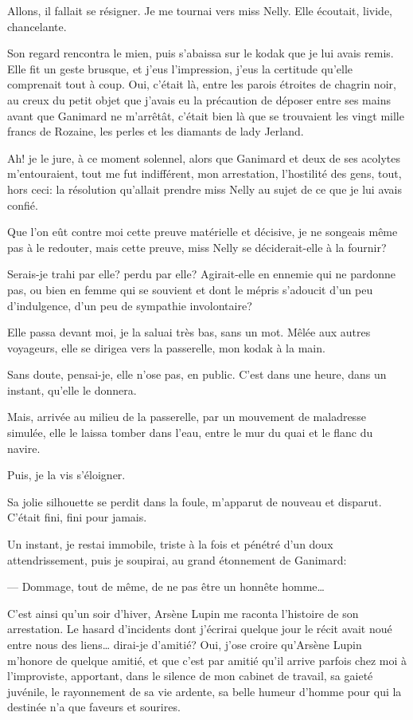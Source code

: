 \documentclass[12pt,a4paper]{book}
\begin{document}
Allons, il fallait se résigner. Je me tournai vers miss Nelly. Elle écoutait, livide, chancelante.

Son regard rencontra le mien, puis s’abaissa sur le kodak que je lui avais remis. Elle fit un geste brusque, et j’eus l’impression, j’eus la certitude qu’elle comprenait tout à coup. Oui, c’était là, entre les parois étroites de chagrin noir, au creux du petit objet que j’avais eu la précaution de déposer entre ses mains avant que Ganimard ne m’arrêtât, c’était bien là que se trouvaient les vingt mille francs de Rozaine, les perles et les diamants de lady Jerland.

Ah! je le jure, à ce moment solennel, alors que Ganimard et deux de ses acolytes m’entouraient, tout me fut indifférent, mon arrestation, l’hostilité des gens, tout, hors ceci: la résolution qu’allait prendre miss Nelly au sujet de ce que je lui avais confié.

Que l’on eût contre moi cette preuve matérielle et décisive, je ne songeais même pas à le redouter, mais cette preuve, miss Nelly se déciderait-elle à la fournir?

Serais-je trahi par elle? perdu par elle? Agirait-elle en ennemie qui ne pardonne pas, ou bien en femme qui se souvient et dont le mépris s’adoucit d’un peu d’indulgence, d’un peu de sympathie involontaire?

Elle passa devant moi, je la saluai très bas, sans un mot. Mêlée aux autres voyageurs, elle se dirigea vers la passerelle, mon kodak à la main.

Sans doute, pensai-je, elle n’ose pas, en public. C’est dans une heure, dans un instant, qu’elle le donnera.

Mais, arrivée au milieu de la passerelle, par un mouvement de maladresse simulée, elle le laissa tomber dans l’eau, entre le mur du quai et le flanc du navire.

Puis, je la vis s’éloigner.

Sa jolie silhouette se perdit dans la foule, m’apparut de nouveau et disparut. C’était fini, fini pour jamais.

Un instant, je restai immobile, triste à la fois et pénétré d’un doux attendrissement, puis je soupirai, au grand étonnement de Ganimard:

— Dommage, tout de même, de ne pas être un honnête homme… 

C’est ainsi qu’un soir d’hiver, Arsène Lupin me raconta l’histoire de son arrestation. Le hasard d’incidents dont j’écrirai quelque jour le récit avait noué entre nous des liens… dirai-je d’amitié? Oui, j’ose croire qu’Arsène Lupin m’honore de quelque amitié, et que c’est par amitié qu’il arrive parfois chez moi à l’improviste, apportant, dans le silence de mon cabinet de travail, sa gaieté juvénile, le rayonnement de sa vie ardente, sa belle humeur d’homme pour qui la destinée n’a que faveurs et sourires.
\end{document}
